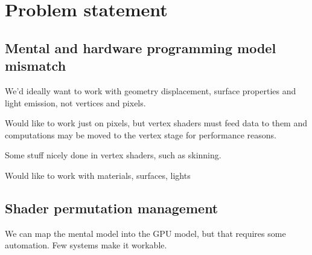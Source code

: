 
\chapter{ Problem statement }
\label{Chapter2}

\section{Mental and hardware programming model mismatch}

We'd ideally want to work with geometry displacement, surface properties and light emission, not vertices and pixels.

Would like to work just on pixels, but vertex shaders must feed data to them and computations may be moved to the vertex stage for performance reasons.

Some stuff nicely done in vertex shaders, such as skinning.

Would like to work with materials, surfaces, lights

\section{Shader permutation management}

 We can map the mental model into the GPU model, but that requires some automation. Few systems make it workable.

